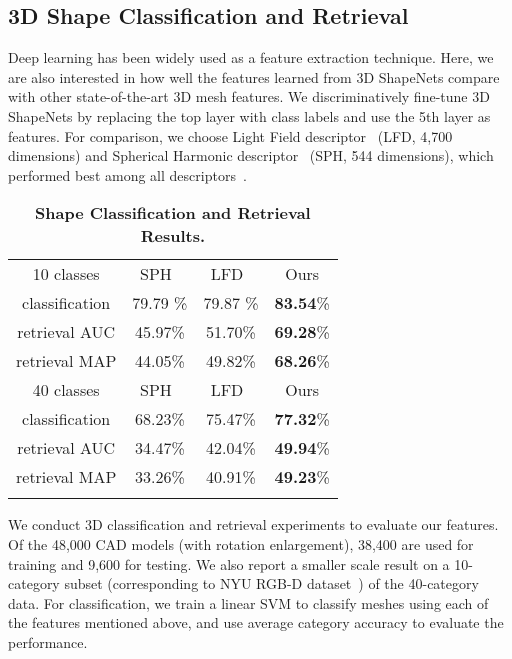 \documentclass[10pt,twocolumn,letterpaper]{article}
\begin{document}
\subsection{3D Shape Classification and Retrieval}
\label{sec:exp:classification}


Deep learning has been widely used as a feature extraction technique. Here, we are also interested in how well the features learned from 3D ShapeNets compare with other state-of-the-art 3D mesh features. We discriminatively fine-tune 3D ShapeNets by replacing the top layer with class labels and use the 5th layer as features. For comparison, we choose Light Field descriptor~\cite{LFDfeature} (LFD, 4,700 dimensions) and Spherical Harmonic descriptor~\cite{SHPfeature} (SPH, 544 dimensions), which performed best among all descriptors~\cite{Psb}. 



\begin{table}[t]
\centering
\begin{tabular}{c|c|c|c}

\Xhline{2\arrayrulewidth}
10 classes & SPH~\cite{SHPfeature} & LFD~\cite{LFDfeature} & Ours\tabularnewline
\Xhline{2\arrayrulewidth}
classification & 79.79 \% & 79.87 \% & {\bf 83.54}\%
\tabularnewline
retrieval AUC & 45.97\% & 51.70\% & {\bf 69.28}\%
\tabularnewline
retrieval MAP & 44.05\% & 49.82\% & {\bf 68.26}\%
\tabularnewline

\Xhline{2\arrayrulewidth}
40 classes & SPH~\cite{SHPfeature} & LFD~\cite{LFDfeature} & Ours\tabularnewline
\Xhline{2\arrayrulewidth}
classification & 68.23\% & 75.47\% & {\bf 77.32}\%
\tabularnewline
retrieval AUC & 34.47\% & 42.04\% & {\bf 49.94}\%
\tabularnewline
retrieval MAP & 33.26\% & 40.91\% & {\bf 49.23}\%
\tabularnewline

\Xhline{2\arrayrulewidth}
\end{tabular}

\vspace{-2mm}
\caption{{\bf Shape Classification and Retrieval Results.} }
\vspace{-2mm}
\label{table:cls}
\end{table}




We conduct 3D classification and retrieval experiments to evaluate our features. Of the 48,000 CAD models (with rotation enlargement), 38,400 are used for training and 9,600 for testing. We also report a smaller scale result on a 10-category subset (corresponding to NYU RGB-D dataset~\cite{NYUdataset}) of the 40-category data. For classification, we train a linear SVM to classify meshes using each of the features mentioned above, and use average category accuracy to evaluate the performance. 
\end{document}
